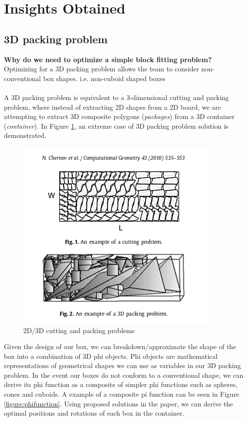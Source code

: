 \documentclass[a4paper, fleqn]{article}
\begin{document}
\section{Insights Obtained}

\subsection{3D packing problem} \cite{1}
\textbf{Why do we need to optimize a simple block fitting problem?}\\
Optimizing for a 3D packing problem allows the team to consider non-conventional box shapes. i.e. non-cuboid shaped boxes\\
\vspace{1pt}\\
A 3D packing problem is equivalent to a 3-dimensional cutting and packing problem, where instead of extracting 2D shapes from a 2D board, we are attempting to extract 3D composite polygons (\textit{packages}) from a 3D container (\textit{container}). In Figure \ref{figure:2d3d}, an extreme case of 3D packing problem solution is demonstrated.
\begin{figure}[h!]
\includegraphics[width=\linewidth]{./assets/201803260707.png}
\caption{2D/3D cutting and packing problems}
\label{figure:2d3d}
\end{figure}
\pagebreak
Given the design of our box, we can breakdown/approximate the shape of the box into a combination of 3D phi objects. Phi objects are mathematical representations of geometrical shapes we can use as variables in our 3D packing problem. In the event our boxes do not conform to a conventional shape, we can derive its phi function as a composite of simpler phi functions such as spheres, cones and cuboids. A example of a composite pi function can be seen in Figure \ref{figure:phifunction}. Using proposed solutions in the paper, we can derive the optimal positions and rotations of each box in the container.
\end{document}
